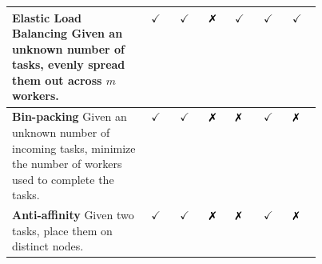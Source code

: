\begin{table}[!t]
\begin{xtabular}{|p{0.45\linewidth}|
  p{\colw em}|p{1.6em}|p{\colw em}||p{\colw em}|p{\colw em}|p{\colw em}|}
  
  \textbf{Elastic Load Balancing}\newline
  Given an unknown number of tasks, evenly spread them out across $m$ workers. 
  \vspace{-4mm}

  &
  $\checkmark$& %
  $\checkmark$\text{{/\xmark}}& %
  $\text{\xmark}$& %
  $\checkmark$& %
  $\checkmark$& %
  $\checkmark$%
  \\
  \hline
  
  \textbf{Bin-packing}\newline 
  Given an unknown number of incoming tasks, minimize the number of workers used to complete the tasks.
  &
  $\checkmark$& %
  $\checkmark$\text{{/\xmark}}& %
  $\text{\xmark}$& %
  $\text{\xmark}$& %
  $\checkmark$& %
  $\text{\xmark}$%
  \\
  \hline
  
  \textbf{Anti-affinity}\newline 
  Given two tasks, place them on distinct nodes.
  &
  $\checkmark$& %
  $\checkmark$\text{{/\checkmark}}& %
  $\text{\xmark}$& %
  $\text{\xmark}$& %
  $\checkmark$& %
  $\text{\xmark}$%
  \\
  \hline
  

\end{xtabular}
\end{table}
